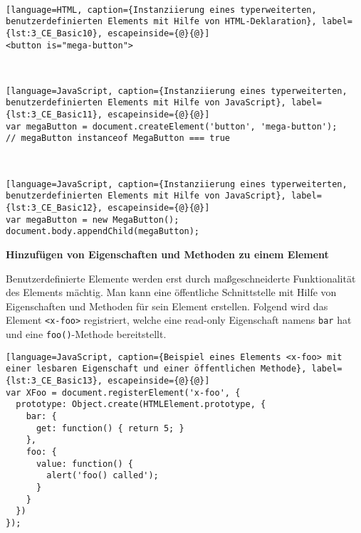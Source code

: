 \begin{enumerate}
 \hfill \\
\begin{lstlisting}[language=HTML, caption={Instanziierung eines typerweiterten, benutzerdefinierten Elements mit Hilfe von HTML-Deklaration}, label={lst:3_CE_Basic10}, escapeinside={@}{@}]
<button is="mega-button">
\end{lstlisting}

 \hfill \\
\begin{lstlisting}[language=JavaScript, caption={Instanziierung eines typerweiterten, benutzerdefinierten Elements mit Hilfe von JavaScript}, label={lst:3_CE_Basic11}, escapeinside={@}{@}]
var megaButton = document.createElement('button', 'mega-button');
// megaButton instanceof MegaButton === true
\end{lstlisting}

 \hfill \\
\begin{lstlisting}[language=JavaScript, caption={Instanziierung eines typerweiterten, benutzerdefinierten Elements mit Hilfe von JavaScript}, label={lst:3_CE_Basic12}, escapeinside={@}{@}]
var megaButton = new MegaButton();
document.body.appendChild(megaButton);
\end{lstlisting}
\end{enumerate}

\textbf{Hinzufügen von Eigenschaften und Methoden zu einem Element}

Benutzerdefinierte Elemente werden erst durch maßgeschneiderte Funktionalität des Elements mächtig. Man kann eine öffentliche Schnittstelle mit Hilfe von Eigenschaften und Methoden für sein Element erstellen. Folgend wird das Element \lstinline|<x-foo>| registriert, welche eine read-only Eigenschaft namens \lstinline|bar| hat und eine \lstinline|foo()|-Methode bereitstellt.

\begin{lstlisting}[language=JavaScript, caption={Beispiel eines Elements <x-foo> mit einer lesbaren Eigenschaft und einer öffentlichen Methode}, label={lst:3_CE_Basic13}, escapeinside={@}{@}]
var XFoo = document.registerElement('x-foo', {
  prototype: Object.create(HTMLElement.prototype, {
    bar: {
      get: function() { return 5; }
    },
    foo: {
      value: function() {
        alert('foo() called');
      }
    }
  })
});
\end{lstlisting}

